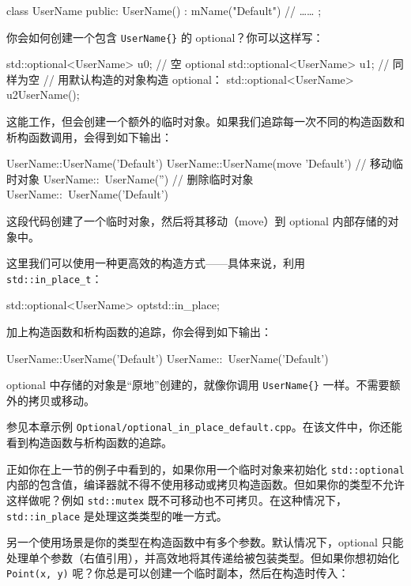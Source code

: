 \begin{codebox}[cpp]
class UserName
{
public:
UserName() : mName("Default")
{
}
// ……
};
\end{codebox}

你会如何创建一个包含 \texttt{UserName\{\}} 的 optional？你可以这样写：

\begin{codebox}[cpp]
std::optional<UserName> u0; // 空 optional
std::optional<UserName> u1{}; // 同样为空
// 用默认构造的对象构造 optional：
std::optional<UserName> u2{UserName()};
\end{codebox}

这能工作，但会创建一个额外的临时对象。如果我们追踪每一次不同的构造函数和析构函数调用，会得到如下输出：

\begin{codebox}[cpp]
UserName::UserName('Default')
UserName::UserName(move 'Default')
// 移动临时对象
UserName::~UserName('')
// 删除临时对象
UserName::~UserName('Default')
\end{codebox}

这段代码创建了一个临时对象，然后将其移动（move）到 optional 内部存储的对象中。

这里我们可以使用一种更高效的构造方式——具体来说，利用 \texttt{std::in\_place\_t}：

\begin{codebox}[cpp]
std::optional<UserName> opt{std::in_place};
\end{codebox}

加上构造函数和析构函数的追踪，你会得到如下输出：

\begin{codebox}[cpp]
UserName::UserName('Default')
UserName::~UserName('Default')
\end{codebox}

optional 中存储的对象是“原地”创建的，就像你调用 \texttt{UserName\{\}} 一样。不需要额外的拷贝或移动。

参见本章示例 \texttt{Optional/optional\_in\_place\_default.cpp}。在该文件中，你还能看到构造函数与析构函数的追踪。

正如你在上一节的例子中看到的，如果你用一个临时对象来初始化 \texttt{std::optional} 内部的包含值，编译器就不得不使用移动或拷贝构造函数。但如果你的类型不允许这样做呢？例如 \texttt{std::mutex} 既不可移动也不可拷贝。在这种情况下，\texttt{std::in\_place} 是处理这类类型的唯一方式。

另一个使用场景是你的类型在构造函数中有多个参数。默认情况下，optional 只能处理单个参数（右值引用），并高效地将其传递给被包装类型。但如果你想初始化 \texttt{Point(x, y)} 呢？你总是可以创建一个临时副本，然后在构造时传入：

